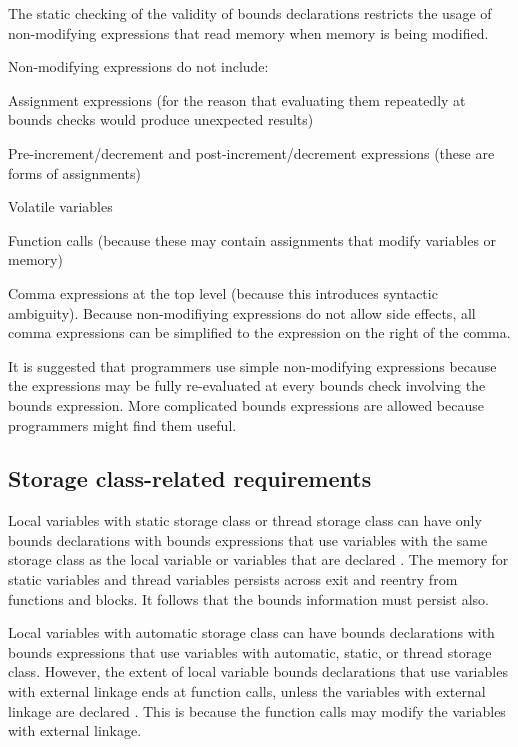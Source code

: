 The static checking of the validity of bounds declarations restricts the
usage of non-modifying expressions that read memory when memory is being
modified.

Non-modifying expressions do not include:

\begin{compactitem}
\item
  Assignment expressions (for the reason that evaluating them repeatedly
  at bounds checks would produce unexpected results)
\item
  Pre-increment/decrement and post-increment/decrement expressions
  (these are forms of assignments)
\item
  Volatile variables
\item
  Function calls (because these may contain assignments that modify
  variables or memory)
\item
  Comma expressions at the top level (because this introduces syntactic
  ambiguity). Because non-modifiying expressions do not allow side effects,
  all comma expressions can be simplified to the expression on
  the right of the comma.
\end{compactitem}

It is suggested that programmers use simple non-modifying expressions because
the expressions may be fully re-evaluated at every bounds check involving the
bounds expression. More complicated bounds expressions are allowed
because programmers might find them useful.

\subsection{Storage class-related requirements}

Local variables with static storage class or thread storage class can
have only bounds declarations with bounds expressions that use variables
with the same storage class as the local variable or variables that are declared
. The memory for static variables and thread variables
persists across exit and reentry from functions and blocks. It follows
that the bounds information must persist also.

Local variables with automatic storage class can have bounds
declarations with bounds expressions that use variables with automatic,
static, or thread storage class. However, the extent of local variable
bounds declarations that use variables with external linkage ends at
function calls, unless the variables with external linkage are declared
. This is because the function calls may modify the
variables with external linkage.


